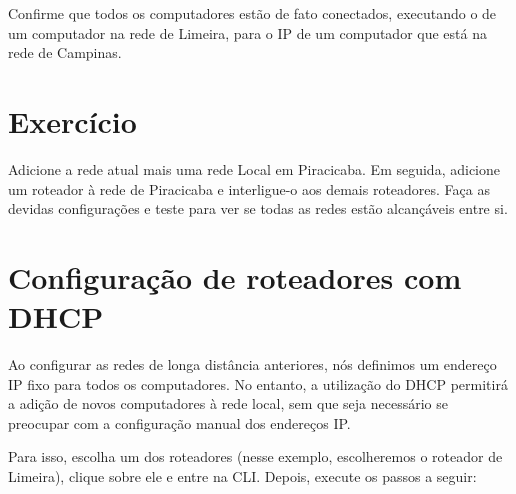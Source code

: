 Confirme que todos os computadores estão de fato conectados, executando o  de um computador na rede de Limeira, para o IP de um computador que está na rede de Campinas.

\section{Exercício}
Adicione a rede atual mais uma rede Local em Piracicaba. Em seguida, adicione um roteador à rede de Piracicaba e interligue-o aos demais roteadores. Faça as devidas configurações e teste para ver se todas as redes estão alcançáveis entre si.

\section{Configuração de roteadores com DHCP}
Ao configurar as redes de longa distância anteriores, nós definimos um endereço IP fixo para todos os computadores. No entanto, a utilização do DHCP permitirá a adição de novos computadores à rede local, sem que seja necessário se preocupar com a configuração manual dos endereços IP.

Para isso, escolha um dos roteadores (nesse exemplo, escolheremos o roteador de Limeira), clique sobre ele e entre na CLI. Depois, execute os passos a seguir:

